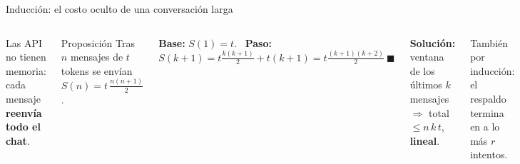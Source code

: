 \documentclass[aspectratio=169,11pt]{beamer}
\begin{document}
\begin{frame}{Inducción: el costo oculto de una conversación larga}
\begin{columns}[c]
Las API no tienen memoria: cada mensaje \textbf{reenvía todo el chat}.
\begin{block}{Proposición}
Tras $n$ mensajes de $t$ tokens se envían $S(n)=t\,\frac{n(n+1)}{2}$.
\end{block}
\textbf{Base:} $S(1)=t$. \ \textbf{Paso:}
{\small $S(k+1)=t\tfrac{k(k+1)}{2}+t(k+1)=t\tfrac{(k+1)(k+2)}{2}\ \blacksquare$}

\vspace{0.2cm}
\textbf{Solución:} ventana de los últimos $k$ mensajes $\Rightarrow$ total $\le n\,k\,t$, \textbf{lineal}.

\vspace{0.1cm}
{\footnotesize También por inducción: el respaldo termina en a lo más $r$ intentos.}
\end{columns}
\end{frame}
\end{document}
